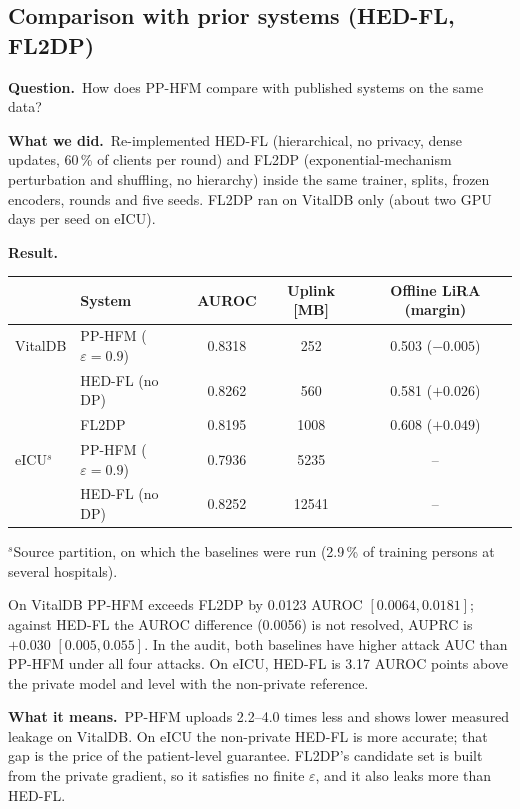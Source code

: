 \documentclass[11pt,a4paper]{article}
\newenvironment{experiment}[2]{\subsection{#1}\label{#2}}{}
\newcommand{\Q}{\par\textbf{Question.}\ }
\newcommand{\D}{\par\textbf{What we did.}\ }
\newcommand{\R}{\par\textbf{Result.}\ }
\newcommand{\M}{\par\textbf{What it means.}\ }
\begin{document}
\begin{experiment}{Comparison with prior systems (HED-FL, FL2DP)}{exp:prior}
\Q How does PP-HFM compare with published systems on the same data?
\D Re-implemented HED-FL (hierarchical, no privacy, dense updates, 60\,\% of
clients per round) and FL2DP (exponential-mechanism perturbation and shuffling,
no hierarchy) inside the same trainer, splits, frozen encoders, rounds and five
seeds. FL2DP ran on VitalDB only (about two GPU days per seed on eICU).
\R
\begin{center}\small
\begin{tabular}{llccc}
\toprule
& System & AUROC & Uplink [MB] & Offline LiRA (margin) \\
\midrule
VitalDB & PP-HFM ($\varepsilon = 0.9$) & 0.8318 & 252 & 0.503 ($-0.005$) \\
 & HED-FL (no DP) & 0.8262 & 560 & 0.581 ($+0.026$) \\
 & FL2DP & 0.8195 & 1008 & 0.608 ($+0.049$) \\
eICU$^{s}$ & PP-HFM ($\varepsilon = 0.9$) & 0.7936 & 5235 & -- \\
 & HED-FL (no DP) & 0.8252 & 12541 & -- \\
\bottomrule
\end{tabular}
\end{center}
{\footnotesize $^{s}$Source partition, on which the baselines were run (2.9\,\% of training persons at several hospitals).}

On VitalDB PP-HFM exceeds FL2DP by 0.0123 AUROC $[0.0064, 0.0181]$; against
HED-FL the AUROC difference (0.0056) is not resolved, AUPRC is $+0.030$
$[0.005, 0.055]$. In the audit, both baselines have higher attack AUC than
PP-HFM under all four attacks. On eICU, HED-FL is 3.17 AUROC points above the
private model and level with the non-private reference.
\M PP-HFM uploads 2.2--4.0 times less and shows lower measured leakage on
VitalDB. On eICU the non-private HED-FL is more accurate; that gap is the price
of the patient-level guarantee. FL2DP's candidate set is built from the private
gradient, so it satisfies no finite $\varepsilon$, and it also leaks more than
HED-FL.
\end{experiment}
\end{document}
